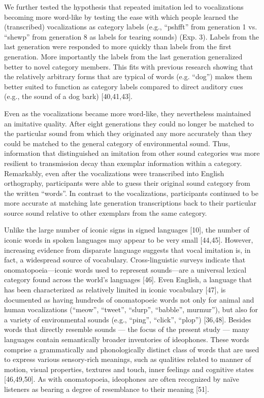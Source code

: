 \documentclass[english,floatsintext,man]{apa6}
\theoremstyle{definition}
\theoremstyle{definition}
\theoremstyle{definition}
\theoremstyle{remark}
\begin{document}
We further tested the hypothesis that repeated imitation led to
vocalizations becoming more word-like by testing the ease with which
people learned the (transcribed) vocalizations as category labels (e.g.,
\enquote{pshfft} from generation 1 vs. \enquote{shewp} from generation 8
as labels for tearing sounds) (Exp. 3). Labels from the last generation
were responded to more quickly than labels from the first generation.
More importantly the labels from the last generation generalized better
to novel category members. This fits with previous research showing that
the relatively arbitrary forms that are typical of words (e.g.
\enquote{dog}) makes them better suited to function as category labels
compared to direct auditory cues (e.g., the sound of a dog bark)
{[}40,41,43{]}.

Even as the vocalizations became more word-like, they nevertheless
maintained an imitative quality. After eight generations they could no
longer be matched to the particular sound from which they originated any
more accurately than they could be matched to the general category of
environmental sound. Thus, information that distinguished an imitation
from other sound categories was more resilient to transmission decay
than exemplar information within a category. Remarkably, even after the
vocalizations were transcribed into English orthography, participants
were able to guess their original sound category from the written
\enquote{words}. In contrast to the vocalizations, participants
continued to be more accurate at matching late generation transcriptions
back to their particular source sound relative to other exemplars from
the same category.

Unlike the large number of iconic signs in signed languages {[}10{]},
the number of iconic words in spoken languages may appear to be very
small {[}44,45{]}. However, increasing evidence from disparate language
suggests that vocal imitation is, in fact, a widespread source of
vocabulary. Cross-linguistic surveys indicate that onomatopoeia---iconic
words used to represent sounds---are a universal lexical category found
across the world's languages {[}46{]}. Even English, a language that has
been characterized as relatively limited in iconic vocabulary {[}47{]},
is documented as having hundreds of onomatopoeic words not only for
animal and human vocalizations (\enquote{meow}, \enquote{tweet},
\enquote{slurp}, \enquote{babble}, murmur''), but also for a variety of
environmental sounds (e.g., \enquote{ping}, \enquote{click},
\enquote{plop}) {[}36,48{]}. Besides words that directly resemble sounds
--- the focus of the present study --- many languages contain
semantically broader inventories of ideophones. These words comprise a
grammatically and phonologically distinct class of words that are used
to express various sensory-rich meanings, such as qualities related to
manner of motion, visual properties, textures and touch, inner feelings
and cognitive states {[}46,49,50{]}. As with onomatopoeia, ideophones
are often recognized by naïve listeners as bearing a degree of
resemblance to their meaning {[}51{]}.
\end{document}
